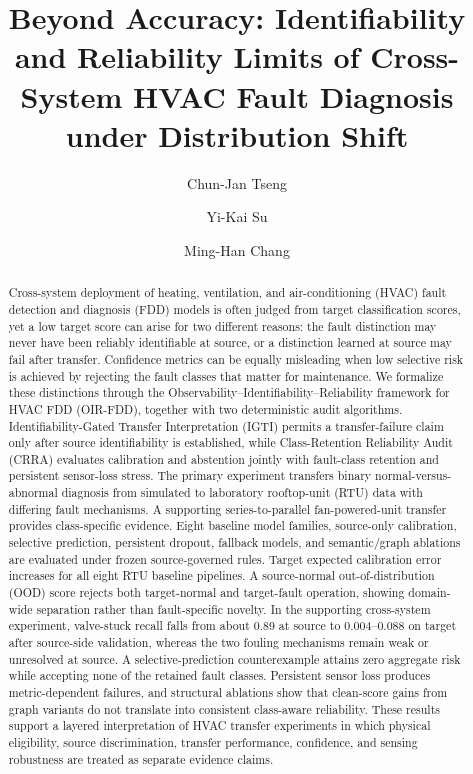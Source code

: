 \documentclass[preprint,12pt]{elsarticle}
\begin{document}
\begin{frontmatter}

\title{Beyond Accuracy: Identifiability and Reliability Limits of Cross-System HVAC Fault Diagnosis under Distribution Shift}

\author[scu]{Chun-Jan Tseng}
\author[ndu]{Yi-Kai Su}
\author[nycu]{Ming-Han Chang}

\address[scu]{Department of Data Science, Soochow University, Taipei 111002, Taiwan, ROC}
\address[ndu]{Department of Financial Management, National Defense University, Taipei 112305, Taiwan, ROC}
\address[nycu]{Department of Industrial Engineering and Management, National Yang Ming Chiao Tung University, Hsinchu 300093, Taiwan, ROC}

\begin{abstract}
Cross-system deployment of heating, ventilation, and air-conditioning (HVAC) fault detection and diagnosis (FDD) models is often judged from target classification scores, yet a low target score can arise for two different reasons: the fault distinction may never have been reliably identifiable at source, or a distinction learned at source may fail after transfer. Confidence metrics can be equally misleading when low selective risk is achieved by rejecting the fault classes that matter for maintenance. We formalize these distinctions through the Observability--Identifiability--Reliability framework for HVAC FDD (OIR-FDD), together with two deterministic audit algorithms. Identifiability-Gated Transfer Interpretation (IGTI) permits a transfer-failure claim only after source identifiability is established, while Class-Retention Reliability Audit (CRRA) evaluates calibration and abstention jointly with fault-class retention and persistent sensor-loss stress. The primary experiment transfers binary normal-versus-abnormal diagnosis from simulated to laboratory rooftop-unit (RTU) data with differing fault mechanisms. A supporting series-to-parallel fan-powered-unit transfer provides class-specific evidence. Eight baseline model families, source-only calibration, selective prediction, persistent dropout, fallback models, and semantic/graph ablations are evaluated under frozen source-governed rules. Target expected calibration error increases for all eight RTU baseline pipelines. A source-normal out-of-distribution (OOD) score rejects both target-normal and target-fault operation, showing domain-wide separation rather than fault-specific novelty. In the supporting cross-system experiment, valve-stuck recall falls from about 0.89 at source to 0.004--0.088 on target after source-side validation, whereas the two fouling mechanisms remain weak or unresolved at source. A selective-prediction counterexample attains zero aggregate risk while accepting none of the retained fault classes. Persistent sensor loss produces metric-dependent failures, and structural ablations show that clean-score gains from graph variants do not translate into consistent class-aware reliability. These results support a layered interpretation of HVAC transfer experiments in which physical eligibility, source discrimination, transfer performance, confidence, and sensing robustness are treated as separate evidence claims.

\end{abstract}
\end{frontmatter}
\end{document}
